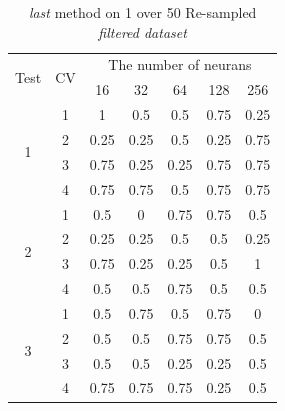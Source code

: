 \documentclass[draft,dvipsnames]{drexel-thesis}
\begin{document}
\begin{thesis}
\begin{table}[!t]
\centering
\caption{{\em last} method on 1 over 50 Re-sampled {\em filtered dataset}}
\label{tbl:last_1_50}
\begin{tabular}{|c|c|c|c|c|c|c|}
\hline
\multirow{2}{*}{Test} & \multirow{2}{*}{CV} & \multicolumn{5}{c|}{The number of neurans}                              \\ \cline{3-7}
                      &                     & 16           & 32           & 64           & 128         & 256          \\ \hline
\multirow{4}{*}{1}    & 1                   & 1            & 0.5          & 0.5          & 0.75        & 0.25         \\ \cline{2-7}
                      & 2                   & 0.25         & 0.25         & 0.5          & 0.25        & 0.75         \\ \cline{2-7}
                      & 3                   & 0.75         & 0.25         & 0.25         & 0.75        & 0.75         \\ \cline{2-7}
                      & 4                   & 0.75         & 0.75         & 0.5          & 0.75        & 0.75         \\ \hline
\multirow{4}{*}{2}    & 1                   & 0.5          & 0            & 0.75         & 0.75        & 0.5          \\ \cline{2-7}
                      & 2                   & 0.25         & 0.25         & 0.5          & 0.5         & 0.25         \\ \cline{2-7}
                      & 3                   & 0.75         & 0.25         & 0.25         & 0.5         & 1            \\ \cline{2-7}
                      & 4                   & 0.5          & 0.5          & 0.75         & 0.5         & 0.5          \\ \hline
\multirow{4}{*}{3}    & 1                   & 0.5          & 0.75         & 0.5          & 0.75        & 0            \\ \cline{2-7}
                      & 2                   & 0.5          & 0.5          & 0.75         & 0.75        & 0.5          \\ \cline{2-7}
                      & 3                   & 0.5          & 0.5          & 0.25         & 0.25        & 0.5          \\ \cline{2-7}
                      & 4                   & 0.75         & 0.75         & 0.75         & 0.25        & 0.5          \\ \hline

\end{tabular}
\end{table}
\end{thesis}
\end{document}
